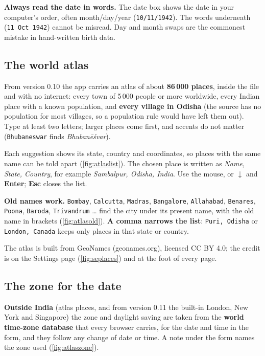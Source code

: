 \documentclass[11pt, a4paper]{article}
\newcommand{\shot}[1]{}
\newcommand{\ui}[1]{\textbf{\textsf{#1}}}   %
\newcommand{\ex}[1]{\texttt{#1}}             %
\begin{document}
\begin{warnbox}\kpit\textbf{Always read the date in words.} The date box shows the date in your
computer's order, often month/day/year (\ex{10/11/1942}). The words underneath (\ex{11 Oct 1942})
cannot be misread. Day and month swaps are the commonest mistake in hand-written birth data.\end{warnbox}

\subsection{The world atlas}
\label{sec:atlas}
From version 0.10 the app carries an atlas of about \textbf{86\,000 places}, inside the file and with no
internet: every town of 5\,000 people or more worldwide, every Indian place with a known population, and
\textbf{every village in Odisha} (the source has no population for most villages, so a population rule
would have left them out). Type at least two letters; larger places come first, and accents do not matter
(\ex{Bhubaneswar} finds \emph{Bhubanēśvar}).

\shot{atlaslist}

Each suggestion shows its state, country and coordinates, so places with the same name can be told apart
(\autoref{fig:atlaslist}). The chosen place is written as \emph{Name, State, Country}, for example
\emph{Sambalpur, Odisha, India}. Use the mouse, or \ui{$\downarrow$} and \ui{Enter}; \ui{Esc} closes the list.

\shot{atlasold}

\begin{keybox}\kidea\textbf{Old names work.} \ex{Bombay}, \ex{Calcutta}, \ex{Madras}, \ex{Bangalore},
\ex{Allahabad}, \ex{Benares}, \ex{Poona}, \ex{Baroda}, \ex{Trivandrum} … find the city under its present
name, with the old name in brackets (\autoref{fig:atlasold}). \textbf{A comma narrows the list}:
\ex{Puri, Odisha} or \ex{London, Canada} keeps only places in that state or country.\end{keybox}

The atlas is built from GeoNames (geonames.org), licensed CC BY 4.0; the credit is on the Settings page
(\autoref{fig:seplaces}) and at the foot of every page.

\subsection{The zone for the date}
\textbf{Outside India} (atlas places, and from version 0.11 the built-in London, New York and Singapore)
the zone and daylight saving are taken from the \textbf{world time-zone database} that every browser carries,
for the date and time in the form, and they follow any change of date or time. A note under the form names
the zone used (\autoref{fig:atlaszone}).
\end{document}
